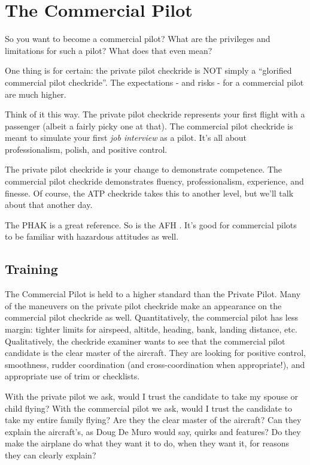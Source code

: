 \chapter{The Commercial Pilot}

So you want to become a commercial pilot? What are the privileges and limitations for such a pilot? What does that even mean?

One thing is for certain: the private pilot checkride is NOT simply a ``glorified commercial pilot checkride''. The expectations - and risks - for a commercial pilot are much higher.

Think of it this way. The private pilot checkride represents your first flight with a passenger (albeit a fairly picky one at that). The commercial pilot checkride is meant to simulate your first \emph{job interview} as a pilot. It's all about professionalism, polish, and positive control.

The private pilot checkride is your change to demonstrate competence. The commercial pilot checkride demonstrates fluency, professionalism, experience, and finesse. Of course, the ATP checkride takes this to another level, but we'll talk about that another day.

The PHAK \cite{PHAK} is a great reference. So is the AFH \cite{AFH}. It's good for commercial pilots to be familiar with hazardous attitudes \cite{adm} as well.

\section{Training}

The Commercial Pilot is held to a higher standard than the Private Pilot. Many of the maneuvers on the private pilot checkride make an appearance on the commercial pilot checkride as well. Quantitatively, the commercial pilot has less margin: tighter limits for airspeed, altitde, heading, bank, landing distance, etc. Qualitatively, the checkride examiner wants to see that the commercial pilot candidate is the clear master of the aircraft. They are looking for positive control, smoothness, rudder coordination (and cross-coordination when appropriate!), and appropriate use of trim or checklists.

With the private pilot we ask, would I trust the candidate to take my spouse or child flying? With the commercial pilot we ask, would I trust the candidate to take my entire family flying? Are they the clear master of the aircraft? Can they explain the aircraft's, as Doug De Muro would say, quirks and features? Do they make the airplane do what they want it to do, when they want it, for reasons they can clearly explain?

